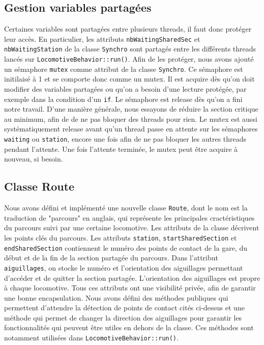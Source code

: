 \documentclass{article}
\begin{document}
\subsection*{Gestion variables partagées}
Certaines variables sont partagées entre plusieurs threads, il faut donc protéger leur accès. En particulier, les attributs
\texttt{nbWaitingSharedSec} et \texttt{nbWaitingStation} de la classe \texttt{Synchro} sont partagés entre les différents threads lancés sur 
\texttt{LocomotiveBehavior::run()}. Afin de les protéger, nous avons ajouté un sémaphore \texttt{mutex} comme attribut de la
classe \texttt{Synchro}. Ce sémaphore est initilaisé à 1 et se comporte donc comme un mutex. Il est acquire dès qu'on doit 
modifier des variables partagées ou qu'on a besoin d'une lecture protégée, par exemple dans la condition d'un \texttt{if}.
Le sémaphore est release dès qu'on a fini notre travail. D'une manière générale, nous essayons de réduire la section critique
au minimum, afin de de ne pas bloquer des threads pour rien. Le mutex est aussi systématiquement release avant qu'un thread passe 
en attente sur les sémaphores \texttt{waiting} ou \texttt{station}, encore une fois afin de ne pas bloquer les autres threads pendant
l'attente. Une fois l'attente terminée, le mutex peut être acquire à nouveau, si besoin.

\subsection*{Classe Route}
Nous avons défini et implémenté une nouvelle classe \texttt{Route}, dont le nom est la traduction de "parcours" en anglais, qui 
représente les principales cractéristiques du parcours suivi par une certaine locomotive. Les attributs de la classe 
décrivent les points clés du parcours. Les attributs \texttt{station}, \texttt{startSharedSection} et \texttt{endSharedSection}
contiennent le numéro des points de contact de la gare, du début et de la fin de la section partagée du parcours. Dans l'attribut
\texttt{aiguillages}, on stocke le numéro et l'orientation des aiguillages permettant d'accéder et de quitter la section partagée.
L'orientation des aiguillages est propre à chaque locomotive. Tous ces attributs ont une visibilité privée, afin de garantir une
bonne encapsulation. Nous avons défini des méthodes publiques qui permettent d'attendre la détection de points de contact cités
ci-dessus et une méthode qui permet de changer la direction des aiguillages pour garantir les fonctionnalités qui peuvent être
utiles en dehors de la classe. Ces méthodes sont notamment utilisées dans \texttt{LocomotiveBehavior::run()}.
\end{document}
